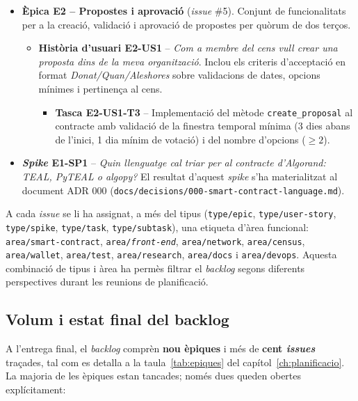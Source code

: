 \begin{itemize}
    \item \textbf{Èpica E2 -- Propostes i aprovació} (\emph{issue} \#5).
    Conjunt de funcionalitats per a la creació, validació i aprovació de propostes per quòrum de dos terços.
    \begin{itemize}
        \item \textbf{Història d'usuari E2-US1} -- \emph{Com a membre del cens vull crear una proposta dins de la meva
        organització}.
        Inclou els criteris d'acceptació en format \emph{Donat/Quan/Aleshores} sobre validacions de dates, opcions
        mínimes i pertinença al cens.
        \begin{itemize}
            \item \textbf{Tasca E2-US1-T3} -- Implementació del mètode \texttt{create\_proposal} al contracte amb
            validació de la finestra temporal mínima (3 dies abans de l'inici, 1 dia mínim de votació) i del nombre
            d'opcions ($\geq 2$).
        \end{itemize}
    \end{itemize}

    \item \textbf{\emph{Spike} E1-SP1} -- \emph{Quin llenguatge cal triar per al contracte d'Algorand: TEAL, PyTEAL o
    algopy?} El resultat d'aquest \emph{spike} s'ha materialitzat al document \ac{ADR} 000
    (\texttt{docs/decisions/000-smart-contract-language.md}).
\end{itemize}

A cada \emph{issue} se li ha assignat, a més del tipus (\texttt{type/epic}, \texttt{type/user-story},
\texttt{type/spike}, \texttt{type/task}, \texttt{type/subtask}), una etiqueta d'àrea funcional:
\texttt{area/smart-contract}, \texttt{area/\textit{front-end}}, \texttt{area/network}, \texttt{area/census},
\texttt{area/wallet}, \texttt{area/test}, \texttt{area/research}, \texttt{area/docs} i \texttt{area/devops}.
Aquesta combinació de tipus i àrea ha permès filtrar el \emph{backlog} segons diferents perspectives durant les reunions
de planificació.

\subsection{Volum i estat final del backlog}
\label{subsec:volum-i-estat-final-del-backlog}

A l'entrega final, el \emph{backlog} comprèn \textbf{nou èpiques} i més de \textbf{cent \emph{issues}} traçades, tal com
es detalla a la taula~\ref{tab:epiques} del capítol~\ref{ch:planificacio}.
La majoria de les èpiques estan tancades; només dues queden obertes explícitament:

